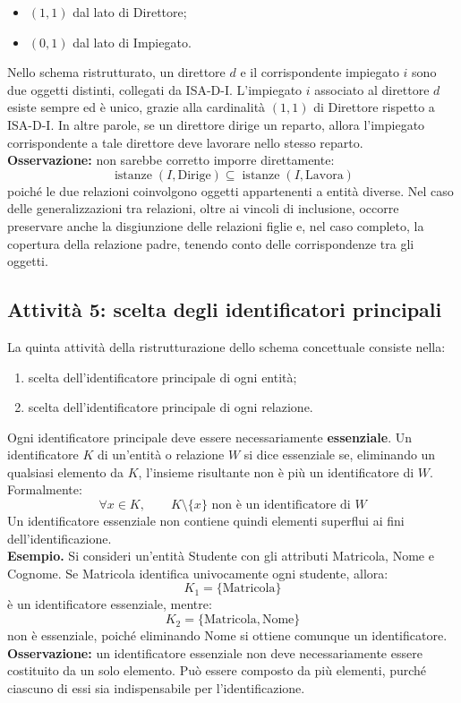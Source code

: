 \begin{itemize}
    \item $(1,1)$ dal lato di Direttore;
    \item $(0,1)$ dal lato di Impiegato.
\end{itemize}
\noindent
Nello schema ristrutturato, un direttore $d$
e il corrispondente impiegato $i$ sono due
oggetti distinti, collegati da ISA-D-I.
L'impiegato $i$ associato al direttore $d$
esiste sempre ed è unico, grazie alla cardinalità
$(1,1)$ di Direttore rispetto a ISA-D-I.
In altre parole, se un direttore dirige un reparto,
allora l'impiegato corrispondente a tale direttore
deve lavorare nello stesso reparto.\medskip\\
\noindent
\textbf{Osservazione:} non sarebbe corretto imporre
direttamente:
\[
\operatorname{istanze}(I,\text{Dirige})
\subseteq
\operatorname{istanze}(I,\text{Lavora})
\]
poiché le due relazioni coinvolgono oggetti
appartenenti a entità diverse.
Nel caso delle generalizzazioni tra relazioni,
oltre ai vincoli di inclusione, occorre preservare
anche la disgiunzione delle relazioni figlie
e, nel caso completo, la copertura della
relazione padre, tenendo conto delle
corrispondenze tra gli oggetti.


\subsection{Attività 5: scelta degli identificatori
principali}
La quinta attività della ristrutturazione dello
schema concettuale consiste nella:
\begin{enumerate}
    \item scelta dell'identificatore principale
    di ogni entità;
    \item scelta dell'identificatore principale
    di ogni relazione.
\end{enumerate}
\noindent
Ogni identificatore principale deve essere
necessariamente \textbf{essenziale}.
Un identificatore $K$ di un'entità o relazione
$W$ si dice essenziale se, eliminando un
qualsiasi elemento da $K$, l'insieme risultante
non è più un identificatore di $W$.
Formalmente:
\[
\forall x\in K,\qquad
K\setminus\{x\}
\text{ non è un identificatore di } W
\]
Un identificatore essenziale non contiene quindi
elementi superflui ai fini dell'identificazione.\medskip\\
\noindent
\textcolor{verdeEsempio}{\textbf{Esempio. }}
Si consideri un'entità Studente con gli attributi
Matricola, Nome e Cognome.
Se Matricola identifica univocamente ogni studente,
allora:
\[
K_1=\{\text{Matricola}\}
\]
è un identificatore essenziale, mentre:
\[
K_2=\{\text{Matricola},\text{Nome}\}
\]
non è essenziale, poiché eliminando Nome si
ottiene comunque un identificatore.\medskip\\
\noindent
\textbf{Osservazione:} un identificatore essenziale
non deve necessariamente essere costituito da un
solo elemento. Può essere composto da più elementi,
purché ciascuno di essi sia indispensabile
per l'identificazione.


